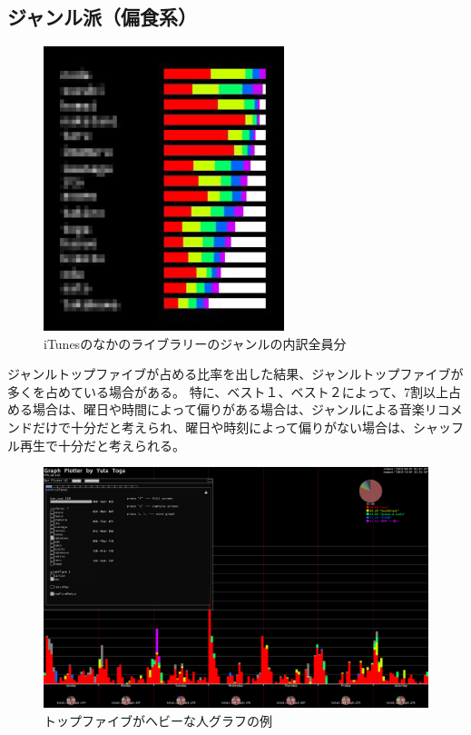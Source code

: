 \documentclass{jsarticle}
\begin{document}
\subsection{ジャンル派（偏食系）}


\begin{figure}[h]
\begin{center}
\includegraphics[width=7cm]{sortedOther.jpg}
\caption{iTunesのなかのライブラリーのジャンルの内訳全員分}
\label{sortedOther}
\end{center}
\end{figure}


ジャンルトップファイブが占める比率を出した結果、ジャンルトップファイブが多くを占めている場合がある。
特に、ベスト１、ベスト２によって、7割以上占める場合は、曜日や時間によって偏りがある場合は、ジャンルによる音楽リコメンドだけで十分だと考えられ、曜日や時刻によって偏りがない場合は、シャッフル再生で十分だと考えられる。
\begin{figure}[h]
\begin{center}
\includegraphics[width=14cm]{topFive_heavy.png}
\caption{トップファイブがヘビーな人グラフの例}
\label{topFive_heavy}
\end{center}
\end{figure}
\end{document}
